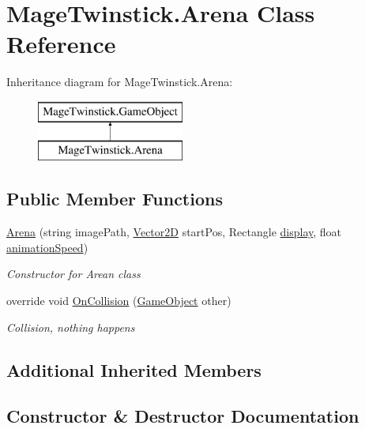 \hypertarget{class_mage_twinstick_1_1_arena}{}\section{Mage\+Twinstick.\+Arena Class Reference}
\label{class_mage_twinstick_1_1_arena}
Inheritance diagram for Mage\+Twinstick.\+Arena\+:\begin{figure}[H]
\begin{center}
\leavevmode
\includegraphics[height=2.000000cm]{class_mage_twinstick_1_1_arena}
\end{center}
\end{figure}
\subsection*{Public Member Functions}
\begin{DoxyCompactItemize}
\item 
\hyperlink{class_mage_twinstick_1_1_arena_aace14406dc02031e9739a08e5be7301b}{Arena} (string image\+Path, \hyperlink{class_mage_twinstick_1_1_vector2_d}{Vector2\+D} start\+Pos, Rectangle \hyperlink{class_mage_twinstick_1_1_game_object_a5807df7f837dc87c8955a008d0b27b50}{display}, float \hyperlink{class_mage_twinstick_1_1_game_object_a5d21c31402c27c5a19f2a62d98720456}{animation\+Speed})
\begin{DoxyCompactList}\small\item\em Constructor for Arean class \end{DoxyCompactList}\item 
override void \hyperlink{class_mage_twinstick_1_1_arena_a12cdc5acc58ee006eb0b5a47507934fc}{On\+Collision} (\hyperlink{class_mage_twinstick_1_1_game_object}{Game\+Object} other)
\begin{DoxyCompactList}\small\item\em Collision, nothing happens \end{DoxyCompactList}\end{DoxyCompactItemize}
\subsection*{Additional Inherited Members}


\subsection{Constructor \& Destructor Documentation}
\hypertarget{class_mage_twinstick_1_1_arena_aace14406dc02031e9739a08e5be7301b}{}
